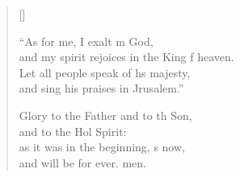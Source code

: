 \begin{verse}[\versewidth]
\begin{patverse}
    “As for me, I exalt m God,\Med\\
    and my spirit rejoices in the King f heaven.\\
    Let all people speak of h\pointup{\i}s majesty,\Med\\
    and sing his praises in Jrusalem.”

    Glory to the Father and to th Son,\Med\\
    and to the Hol Spirit:\\
    as it was in the beginning, \pointup{\i}s now,\Med\\
    and will be for ever. men.
  \end{patverse}
\end{verse}
